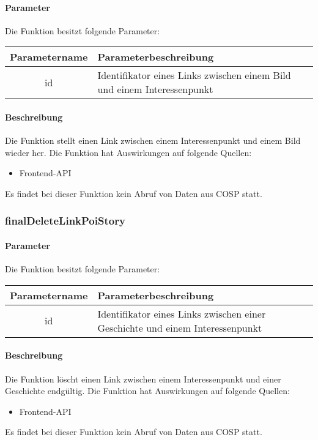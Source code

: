 \paragraph{Parameter} Die Funktion besitzt folgende Parameter:
\begin{table}[H]
	\begin{tabular}{|c|p{11cm}|}
		\hline
		\textbf{Parametername} & \textbf{Parameterbeschreibung} \\ \hline
		id & Identifikator eines Links zwischen einem Bild und einem Interessenpunkt \\ \hline
	\end{tabular}
\end{table}
\paragraph{Beschreibung} Die Funktion stellt einen Link zwischen einem Interessenpunkt und einem Bild wieder her. Die Funktion hat Auswirkungen auf folgende Quellen:
\begin{itemize}
	\item Frontend-API
\end{itemize}
Es findet bei dieser Funktion kein Abruf von Daten aus {\glqq COSP\grqq} statt.
\subsubsection{finalDeleteLinkPoiStory}
\paragraph{Parameter} Die Funktion besitzt folgende Parameter:
\begin{table}[H]
	\begin{tabular}{|c|p{11cm}|}
		\hline
		\textbf{Parametername} & \textbf{Parameterbeschreibung} \\ \hline
		id & Identifikator eines Links zwischen einer Geschichte und einem Interessenpunkt \\ \hline
	\end{tabular}
\end{table}
\paragraph{Beschreibung} Die Funktion löscht einen Link zwischen einem Interessenpunkt und einer Geschichte endgültig. Die Funktion hat Auswirkungen auf folgende Quellen:
\begin{itemize}
	\item Frontend-API
\end{itemize}
Es findet bei dieser Funktion kein Abruf von Daten aus {\glqq COSP\grqq} statt.
